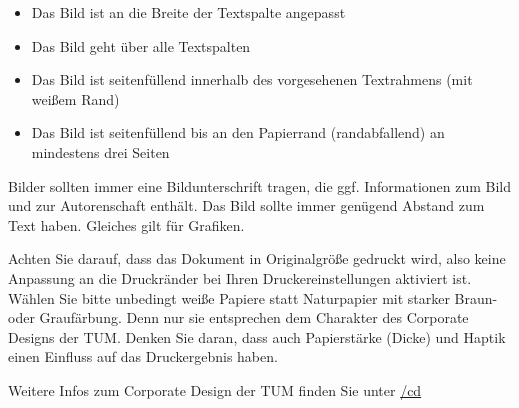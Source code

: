 \begin{itemize}
\item Das Bild ist an die Breite der Textspalte angepasst
\item Das Bild geht über alle Textspalten
\item Das Bild ist seitenfüllend innerhalb des vorgesehenen Textrahmens (mit weißem Rand)
\item Das Bild ist seitenfüllend bis an den Papierrand (randabfallend) an mindestens drei Seiten
\end{itemize}

Bilder sollten immer eine Bildunterschrift tragen, die ggf. Informationen zum Bild und zur Autorenschaft enthält. 
Das Bild sollte immer genügend Abstand zum Text haben. Gleiches gilt für Grafiken.

\ifx\PlakatBeschreibungBeispielbild\TRUE
{}
\fi

\ifx\PlakatBeschreibungDruck\TRUE
{}

Achten Sie darauf, dass das Dokument in Originalgröße gedruckt wird, also keine Anpassung an die Druckränder bei Ihren Druckereinstellungen aktiviert ist.
Wählen Sie bitte unbedingt weiße Papiere statt Naturpapier mit starker Braun- oder Graufärbung. Denn nur sie entsprechen dem Charakter des Corporate Designs der TUM. Denken Sie daran, dass auch Papierstärke (Dicke) und Haptik einen Einfluss auf das Druckergebnis haben.
\fi

\fi %

Weitere Infos zum Corporate Design der TUM finden Sie unter
\href{http://\UniversitaetWebseite/cd}{\UniversitaetWebseite/cd}

